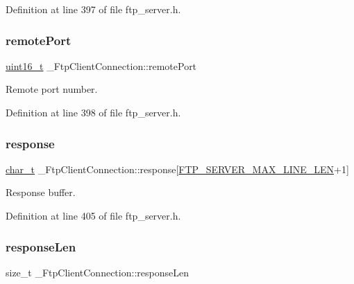 Definition at line 397 of file ftp\+\_\+server.\+h.

\mbox{\label{struct__FtpClientConnection_ad1173df8d2ab79484f1ce16c868e1f3d}} 
\subsubsection{\texorpdfstring{remote\+Port}{remotePort}}
{\footnotesize\ttfamily \hyperlink{stdint_8h_a273cf69d639a59973b6019625df33e30}{uint16\+\_\+t} \+\_\+\+Ftp\+Client\+Connection\+::remote\+Port}



Remote port number. 



Definition at line 398 of file ftp\+\_\+server.\+h.

\mbox{\label{struct__FtpClientConnection_ab77cf9a459475c16caa0d4204d7c6ca0}} 
\subsubsection{\texorpdfstring{response}{response}}
{\footnotesize\ttfamily \hyperlink{compiler__port_8h_a40bb5262bf908c328fbcfbe5d29d0201}{char\+\_\+t} \+\_\+\+Ftp\+Client\+Connection\+::response\mbox{[}\hyperlink{ftp__server_8h_a311e12601252dc2319ee256bb6e714ba}{F\+T\+P\+\_\+\+S\+E\+R\+V\+E\+R\+\_\+\+M\+A\+X\+\_\+\+L\+I\+N\+E\+\_\+\+L\+EN}+1\mbox{]}}



Response buffer. 



Definition at line 405 of file ftp\+\_\+server.\+h.

\mbox{\label{struct__FtpClientConnection_acf313cf05ba0f5ac28a472e312457be2}} 
\subsubsection{\texorpdfstring{response\+Len}{responseLen}}
{\footnotesize\ttfamily size\+\_\+t \+\_\+\+Ftp\+Client\+Connection\+::response\+Len}



